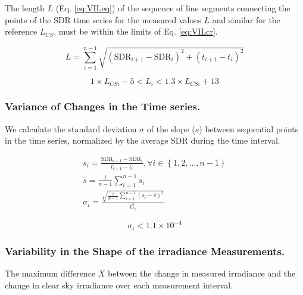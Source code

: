 \documentclass[
  preprint, 3p, authoryear]{article}
\begin{document}
The length \(L\) (Eq. \ref{eq:VILeq}) of the sequence of line segments connecting the points of the SDR time
series for the measured values \(L\) and similar for the reference \(L_{CS}\), must be within the limits of Eq. \ref{eq:VILcr}.

\begin{equation}
L = \sum_{i=1}^{n-1}\sqrt{\left ( \text{SDR}_{i+1} - \text{SDR}_{i}\right )^2 + \left ( t_{i+1} - t_i \right )^2}
\label{eq:VILeq}
\end{equation}

\begin{equation}
1 \times L_{CSi} - 5 < L_i < 1.3 \times L_{CSi} + 13
\label{eq:VILcr}
\end{equation}

\hypertarget{variance-of-changes-in-the-time-series.}{%
\subsubsection{Variance of Changes in the Time series.}\label{variance-of-changes-in-the-time-series.}}

We calculate the standard deviation \(\sigma\) of the slope
(\(s\)) between sequential points in the time series, normalized by the average SDR during the time interval.

\begin{gather}
s_i = \frac{\text{SDR}_{i+1} - \text{SDR}_{i}}{t_{i+1} - t_i}, \forall i \in \left \{ 1, 2, \ldots, n-1 \right \} \label{eq:VCT1} \\
\bar{s} = \frac{1}{n-1} \sum_{i=1}^{n-1} s_i \label{eq:VCT2} \\
\sigma_i = \frac {\sqrt{\frac{1}{n-1} \sum_{i=1}^{n-1} \left( s_i - \bar{s} \right)^2} } {\bar{G_i}} \label{eq:VCT3}
\end{gather}

\begin{equation}
\sigma_i < \ensuremath{1.1\times 10^{-4}}
\label{eq:VCTcr}
\end{equation}

\hypertarget{variability-in-the-shape-of-the-irradiance-measurements.}{%
\subsubsection{Variability in the Shape of the irradiance Measurements.}\label{variability-in-the-shape-of-the-irradiance-measurements.}}

The maximum difference \(X\) between the change in measured irradiance and the change in clear sky
irradiance over each measurement interval.
\end{document}
